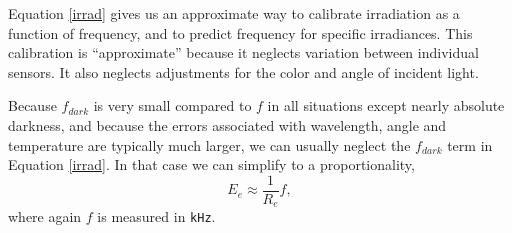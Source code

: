 {Equation \ref{irrad} gives us an approximate way to calibrate irradiation as a function of frequency, and to predict frequency for specific irradiances.
This calibration is ``approximate'' because it neglects variation between individual sensors.
It also neglects adjustments for the color and angle of incident light.

Because $f_{dark}$ is very small compared to $f$ in all situations except nearly absolute darkness, and because the errors associated with wavelength, angle and temperature are typically much larger, we can usually neglect the $f_{dark}$ term in Equation \ref{irrad}.
In that case we can simplify to a proportionality,
\begin{equation}\label{irrad2}
E_e \approx \frac{1}{R_e} f,
\end{equation}
where again $f$ is measured in \texttt{kHz}.

}
